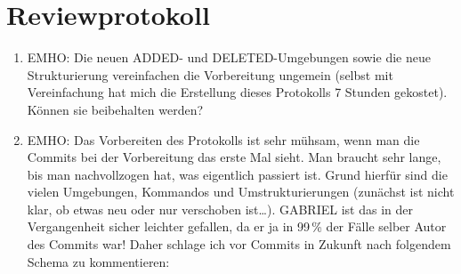 \documentclass[
ngerman,
paper=a4,
asymmetric,
fontsize=10pt,
draft=false,
numbers=noenddot,
bibtotocnumbered,
footnotes=multiple,
]{scrreprt}
\begin{document}
\section{Reviewprotokoll}
\begin{enumerate}
  \item EMHO: Die neuen ADDED- und DELETED-Umgebungen sowie die neue Strukturierung
vereinfachen die Vorbereitung ungemein (selbst mit Vereinfachung hat mich die
Erstellung dieses Protokolls 7 Stunden gekostet).
Können sie beibehalten werden?
\item EMHO: Das Vorbereiten des Protokolls ist sehr mühsam, wenn man die Commits
bei der Vorbereitung das erste Mal sieht. Man braucht sehr lange, bis man
nachvollzogen hat, was eigentlich passiert ist. Grund hierfür sind die vielen
Umgebungen, Kommandos und Umstrukturierungen (zunächst ist nicht klar, ob etwas
neu oder nur verschoben ist\ldots). \textsc{GABRIEL} ist das
in der Vergangenheit sicher leichter gefallen, da er ja in 99\,\% der Fälle selber Autor des Commits war!
Daher schlage ich vor Commits in Zukunft nach folgendem Schema zu kommentieren:


\end{enumerate}
\end{document}
